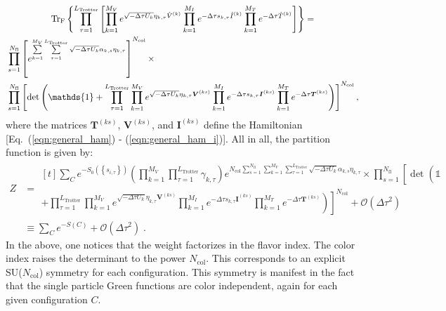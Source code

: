 \begin{multline}
\Trf{ \left\{  \prod_{\tau=1}^{L_{\mathrm{Trotter}}} \left[    
    \prod_{k=1}^{M_V}   e^{  \sqrt{ - \Delta \tau  U_k} \eta_{k,\tau} \hat{V}^{(k)} }   \prod_{k=1}^{M_I}   e^{  -\Delta \tau s_{k,\tau}  \hat{I}^{(k)}} 
    \prod_{k=1}^{M_T}   e^{-\Delta \tau \hat{T}^{(k)}}   \right]   \right\}} = \\
\begin{aligned}
&\prod\limits_{s=1}^{N_{\mathrm{fl}}} \left[  e^{\sum\limits_{k=1}^{M_V} \sum\limits_{\tau = 1}^{L_{\mathrm{Trotter}}}\sqrt{-\Delta \tau U_k}  \alpha_{k,s} \eta_{k,\tau} } \right]^{N_{\mathrm{col}}} \times \\
&\prod\limits_{s=1}^{N_{\mathrm{fl}}} 
   \left[
    \det\left(  \mathds{1} + 
     \prod_{\tau=1}^{L_{\mathrm{Trotter}}}   
    \prod_{k=1}^{M_V}   e^{  \sqrt{ -\Delta \tau  U_k} \eta_{k,\tau} {\bm V}^{(ks)} }   \prod_{k=1}^{M_I}   e^{  -\Delta \tau s_{k,\tau}  {\bm I}^{(ks)}}  
      \prod_{k=1}^{M_T}   e^{-\Delta \tau \bm{T}^{(ks)}}   \right) \right]^{N_{\mathrm{col}}},
\end{aligned}
\end{multline}
where the matrices $\bm{T}^{(ks)}$,  $\bm{V}^{(ks)}$, and  $\bm{I}^{(ks)}$ define the Hamiltonian [Eq.~(\ref{eqn:general_ham}) - (\ref{eqn:general_ham_i})].
All in all, the partition function is given by:
\begin{align}\label{eqn:partition_2}
    Z  &=   \begin{multlined}[t]   \sum_{C}   e^{-S_0 \left( \left\{ s_{i,\tau} \right\}  \right) }     \left( \prod_{k=1}^{M_V} \prod_{\tau=1}^{L_{\mathrm{Trotter}}} \gamma_{k,\tau} \right)
    e^{ N_{\mathrm{col}}\sum\limits_{s=1}^{N_{\mathrm{fl}}} \sum\limits_{k=1}^{M_V} \sum\limits_{\tau = 1}^{L_{\mathrm{Trotter}}}\sqrt{-\Delta \tau U_k}  \alpha_{k,s} \eta_{k,\tau} } 
  \times  \prod_{s=1}^{N_{\mathrm{fl}}}\left[\det\left(  \mathds{1}   \phantom{\prod_{k=1}^{M_V}}   \right. \right. \\
   \left. \left.   + \prod_{\tau=1}^{L_{\mathrm{Trotter}}}   
    \prod_{k=1}^{M_V}   e^{  \sqrt{ -\Delta \tau  U_k} \eta_{k,\tau} {\bm V}^{(ks)} }   \prod_{k=1}^{M_I}   e^{  -\Delta \tau s_{k,\tau}  {\bm I}^{(ks)}}  
     \prod_{k=1}^{M_T}   e^{-\Delta \tau {\bm T}^{(ks)}} 
     \right) \right]^{N_{\mathrm{col}}} + \mathcal{O}(\Delta\tau^{2})  \end{multlined} \nonumber \\ 
     & \equiv  \sum_{C} e^{-S(C) } + \mathcal{O}(\Delta\tau^{2})\;.
\end{align}
In the above, one notices that the weight factorizes in  the flavor index. The color index raises the determinant to the power $N_{\mathrm{col}}$. 
This corresponds to  an explicit SU($N_{\mathrm{col}}$) symmetry   for each  configuration. This symmetry is manifest in the fact that the single particle  Green functions are color independent, again for each given  configuration $C$.


